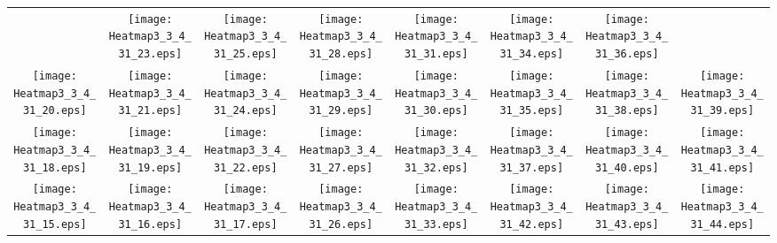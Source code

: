 \documentclass{standalone}
\begin{document}
\renewcommand{\arraystretch}{0}
\setlength{\tabcolsep}{0pt}
\begin{tabular}{ *8{c} }
 & \texttt{[image: Heatmap3\_3\_4\_31\_23.eps]} & \texttt{[image: Heatmap3\_3\_4\_31\_25.eps]} & \texttt{[image: Heatmap3\_3\_4\_31\_28.eps]} & \texttt{[image: Heatmap3\_3\_4\_31\_31.eps]} & \texttt{[image: Heatmap3\_3\_4\_31\_34.eps]} & \texttt{[image: Heatmap3\_3\_4\_31\_36.eps]} &  \\
\texttt{[image: Heatmap3\_3\_4\_31\_20.eps]} & \texttt{[image: Heatmap3\_3\_4\_31\_21.eps]} & \texttt{[image: Heatmap3\_3\_4\_31\_24.eps]} & \texttt{[image: Heatmap3\_3\_4\_31\_29.eps]} & \texttt{[image: Heatmap3\_3\_4\_31\_30.eps]} & \texttt{[image: Heatmap3\_3\_4\_31\_35.eps]} & \texttt{[image: Heatmap3\_3\_4\_31\_38.eps]} & \texttt{[image: Heatmap3\_3\_4\_31\_39.eps]} \\
\texttt{[image: Heatmap3\_3\_4\_31\_18.eps]} & \texttt{[image: Heatmap3\_3\_4\_31\_19.eps]} & \texttt{[image: Heatmap3\_3\_4\_31\_22.eps]} & \texttt{[image: Heatmap3\_3\_4\_31\_27.eps]} & \texttt{[image: Heatmap3\_3\_4\_31\_32.eps]} & \texttt{[image: Heatmap3\_3\_4\_31\_37.eps]} & \texttt{[image: Heatmap3\_3\_4\_31\_40.eps]} & \texttt{[image: Heatmap3\_3\_4\_31\_41.eps]} \\
\texttt{[image: Heatmap3\_3\_4\_31\_15.eps]} & \texttt{[image: Heatmap3\_3\_4\_31\_16.eps]} & \texttt{[image: Heatmap3\_3\_4\_31\_17.eps]} & \texttt{[image: Heatmap3\_3\_4\_31\_26.eps]} & \texttt{[image: Heatmap3\_3\_4\_31\_33.eps]} & \texttt{[image: Heatmap3\_3\_4\_31\_42.eps]} & \texttt{[image: Heatmap3\_3\_4\_31\_43.eps]} & \texttt{[image: Heatmap3\_3\_4\_31\_44.eps]} \\

\end{tabular}
\end{document}
